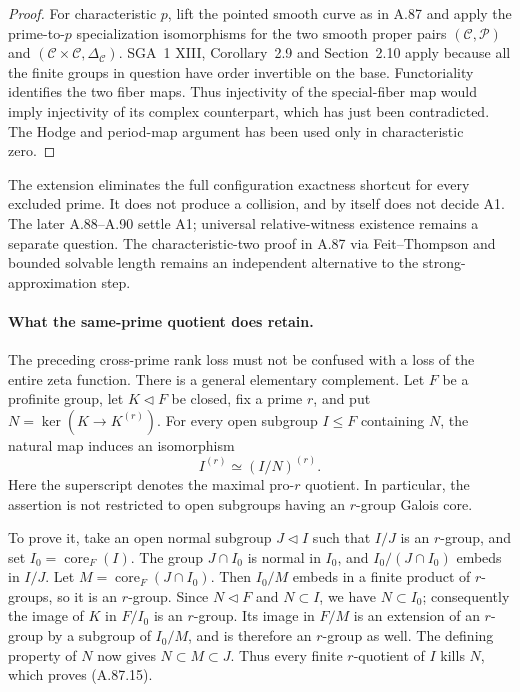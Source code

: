 \documentclass[11pt]{article}
\begin{document}
\begin{proof}
For characteristic \(p\), lift the pointed smooth curve
as in A.87 and apply the prime-to-\(p\) specialization
isomorphisms for the two smooth proper pairs
\((\mathcal C,\mathcal P)\) and
\((\mathcal C\times\mathcal C,\Delta_{\mathcal C})\).
SGA~1 XIII, Corollary~2.9 and Section~2.10 apply because
all the finite groups in question have order invertible
on the base. Functoriality identifies the two fiber maps.
Thus injectivity of the special-fiber map would imply
injectivity of its complex counterpart, which has just
been contradicted. The Hodge and period-map argument has
been used only in characteristic zero.
\end{proof}

The extension eliminates the full configuration exactness
shortcut for every excluded prime. It does not produce a
collision, and by itself does not decide A1.
The later A.88--A.90 settle A1; universal relative-witness
existence remains a separate question. The characteristic-two proof in A.87
via Feit--Thompson and bounded solvable length remains an
independent alternative to the strong-approximation step.

\paragraph{What the same-prime quotient does retain.}
The preceding cross-prime rank loss must not be confused
with a loss of the entire zeta function. There is a general
elementary complement. Let \(F\) be a profinite group,
let \(K\triangleleft F\) be closed, fix a prime \(r\),
and put \(N=\ker(K\to K^{(r)})\). For every open
subgroup \(I\leq F\) containing \(N\), the natural map
induces an isomorphism
\[
                         I^{(r)}\simeq (I/N)^{(r)}.
                                                        \tag{A.87.15}
\]
Here the superscript denotes the maximal pro-\(r\)
quotient. In particular, the assertion is not restricted
to open subgroups having an \(r\)-group Galois core.

To prove it, take an open normal subgroup \(J\triangleleft I\)
such that \(I/J\) is an \(r\)-group, and set
\(I_0=\operatorname{core}_F(I)\).
The group \(J\cap I_0\) is normal in \(I_0\), and
\(I_0/(J\cap I_0)\) embeds in \(I/J\).
Let \(M=\operatorname{core}_F(J\cap I_0)\).
Then \(I_0/M\) embeds in a finite product of
\(r\)-groups, so it is an \(r\)-group. Since
\(N\triangleleft F\) and \(N\subset I\), we have
\(N\subset I_0\); consequently the image of \(K\)
in \(F/I_0\) is an \(r\)-group. Its image in
\(F/M\) is an extension of an \(r\)-group by a
subgroup of \(I_0/M\), and is therefore an
\(r\)-group as well. The defining property of \(N\)
now gives \(N\subset M\subset J\). Thus every
finite \(r\)-quotient of \(I\) kills \(N\),
which proves (A.87.15).
\end{document}
